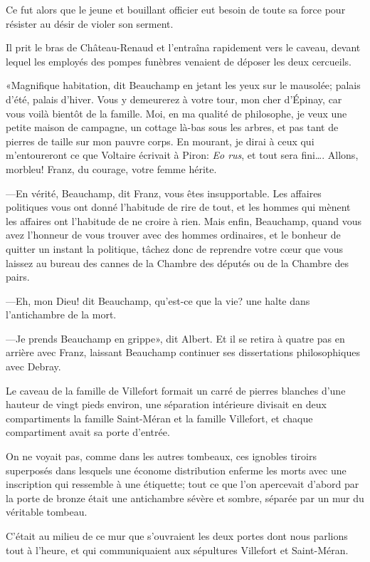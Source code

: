 Ce fut alors que le jeune et bouillant officier eut besoin de toute sa force pour résister au désir de violer son serment. 

Il prit le bras de Château-Renaud et l'entraîna rapidement vers le caveau, devant lequel les employés des pompes funèbres venaient de déposer les deux cercueils. 

«Magnifique habitation, dit Beauchamp en jetant les yeux sur le mausolée; palais d'été, palais d'hiver. Vous y demeurerez à votre tour, mon cher d'Épinay, car vous voilà bientôt de la famille. Moi, en ma qualité de philosophe, je veux une petite maison de campagne, un cottage là-bas sous les arbres, et pas tant de pierres de taille sur mon pauvre corps. En mourant, je dirai à ceux qui m'entoureront ce que Voltaire écrivait à Piron: \textit{Eo rus}, et tout sera fini\dots. Allons, morbleu! Franz, du courage, votre femme hérite. 

—En vérité, Beauchamp, dit Franz, vous êtes insupportable. Les affaires politiques vous ont donné l'habitude de rire de tout, et les hommes qui mènent les affaires ont l'habitude de ne croire à rien. Mais enfin, Beauchamp, quand vous avez l'honneur de vous trouver avec des hommes ordinaires, et le bonheur de quitter un instant la politique, tâchez donc de reprendre votre cœur que vous laissez au bureau des cannes de la Chambre des députés ou de la Chambre des pairs. 

—Eh, mon Dieu! dit Beauchamp, qu'est-ce que la vie? une halte dans l'antichambre de la mort. 

—Je prends Beauchamp en grippe», dit Albert. Et il se retira à quatre pas en arrière avec Franz, laissant Beauchamp continuer ses dissertations philosophiques avec Debray. 

Le caveau de la famille de Villefort formait un carré de pierres blanches d'une hauteur de vingt pieds environ, une séparation intérieure divisait en deux compartiments la famille Saint-Méran et la famille Villefort, et chaque compartiment avait sa porte d'entrée. 

On ne voyait pas, comme dans les autres tombeaux, ces ignobles tiroirs superposés dans lesquels une économe distribution enferme les morts avec une inscription qui ressemble à une étiquette; tout ce que l'on apercevait d'abord par la porte de bronze était une antichambre sévère et sombre, séparée par un mur du véritable tombeau. 

C'était au milieu de ce mur que s'ouvraient les deux portes dont nous parlions tout à l'heure, et qui communiquaient aux sépultures Villefort et Saint-Méran. 

